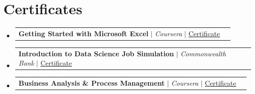 \documentclass[letterpaper,11pt]{article}
\makeatletter
\newcommand{\resumeProjectHeading}[2]{
    \item
    \begin{tabular*}{0.97\textwidth}{l@{\extracolsep{\fill}}r}
      \small#1 & #2 \\
    \end{tabular*}\vspace{-7pt}
}
\newcommand{\resumeSubHeadingListStart}{\begin{itemize}[leftmargin=0.15in, label={}]}
\newcommand{\resumeSubHeadingListEnd}{\end{itemize}}
\makeatother
\begin{document}
\section{Certificates}
  \resumeSubHeadingListStart
    \resumeProjectHeading
  {\textbf{Getting Started with Microsoft Excel} $|$ \emph{Coursera} $|$ \href{https://www.linkedin.com/posts/sriraj-w-v-p-s_excel-dataanalysis-learning-activity-7303450812817489920-4naH}{\underline{Certificate}}}{}
    \resumeProjectHeading
  {\textbf{Introduction to Data Science Job Simulation} $|$ \emph{Commonwealth Bank} $|$ \href{https://www.linkedin.com/posts/sriraj-w-v-p-s_commonwealth-bank-introduction-to-data-science-activity-7307438109439229953-wAkr}{\underline{Certificate}}}{}
    \resumeProjectHeading
  {\textbf{Business Analysis \& Process Management} $|$ \emph{Coursera} $|$ \href{https://drive.google.com/file/d/116oIlee4IXITvyIGohyvSXwjDm9ZhIMA/view?usp=sharing}{\underline{Certificate}}}{}
  \resumeSubHeadingListEnd
\end{document}
